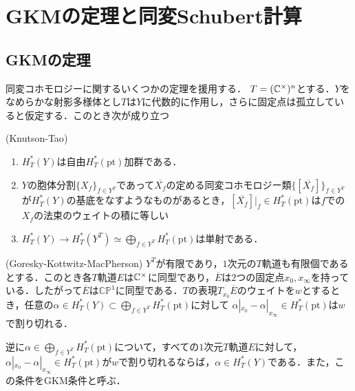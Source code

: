 \section{GKMの定理と同変Schubert計算}
\subsection{GKMの定理}
同変コホモロジーに関するいくつかの定理を援用する．
$T=(\mathbb{C}^\times)^n$とする．$Y$をなめらかな射影多様体とし$T$は$Y$に代数的に作用し，さらに固定点は孤立していると仮定する．このとき次が成り立つ

\begin{theo}(Knutson-Tao\cite{knutson tao})\label{restriction to fixed point}
  \begin{enumerate}
    \item $H^*_T(Y)$は自由$H^*_T(\text{pt})$加群である．
    \item $Y$の胞体分割$\{X_f\}_{f\in Y^T}$であって$\overline{X_f}$の定める同変コホモロジー類$\{[\overline{X_f}]\}_{f\in Y^T}$が$H^*_T(Y)$の基底をなすようなものがあるとき，$[\overline{X_f}]|_f\in H^*_T(\text{pt})$は$f$での$X_f$の法束のウェイトの積に等しい
    \item $H^*_T(Y)\rightarrow H^*_T(Y^T) \simeq \bigoplus_{f\in Y^T}H^*_T(\text{pt})$は単射である．
  \end{enumerate}
\end{theo}

\begin{theo}(Goresky-Kottwitz-MacPherson\cite{GKM})\label{gkm theorem}
  $Y^T$が有限であり，$1$次元の$T$軌道も有限個であるとする．このとき各$T$軌道$E$は$\mathbb{C}^\times$に同型であり，$\overline{E}$は$2$つの固定点$x_0,x_\infty$を持っている．したがって$\overline{E}$は$\mathbb{CP}^1$に同型である．$T$の表現$T_{x_0}\overline{E}$のウェイトを$w$とするとき，任意の$\alpha\in H^*_T(Y)\subset \bigoplus_{f\in Y^T}H^*_T(\text{pt})$に対して
  $\alpha|_{x_0} - \alpha|_{x_\infty}\in H^*_T(\text{pt})$は$w$で割り切れる．
  
  逆に$\alpha\in \bigoplus_{f\in Y^T}H^*_T(\text{pt})$について，すべての$1$次元$T$軌道$E$に対して，$\alpha|_{x_0} - \alpha|_{x_\infty}\in H^*_T(\text{pt})$が$w$で割り切れるならば，$\alpha\in H^*_T(Y)$である．また，この条件をGKM条件と呼ぶ．
\end{theo}


